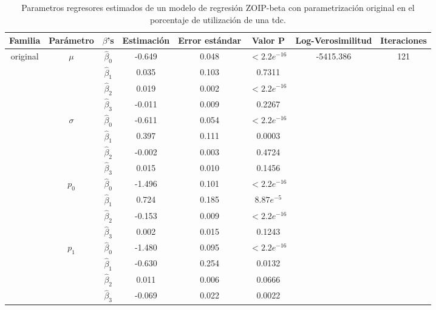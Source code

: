 \begin{table}[!hbt]
{\scriptsize
\begin{center}
\begin{tabular}{|c|c|c|ccc|c|c|}\hline
Familia & Par\'{a}metro & $\beta$'s & Estimaci\'{o}n & Error est\'{a}ndar & Valor P & Log-Verosimilitud & Iteraciones \\ \hline \hline
\multirow{12}{*}{original} & \multirow{4}{*}{$\mu$} & $\hat{\beta}_0$ & -0.649	&0.048	&$<2.2e^{-16}$  & \multirow{12}{*}{-5415.386} & \multirow{12}{*}{121} \\
& & $\hat{\beta}_1$ & 0.035	&0.103	&0.7311   & &\\
& & $\hat{\beta}_2$ & 0.019	&0.002	&$<2.2e^{-16}$   & &\\
& & $\hat{\beta}_3$ & -0.011	&0.009	&0.2267 & & \\ \cline{2-6}
& \multirow{4}{*}{$\sigma$} & $\hat{\beta}_0$ & -0.611	&0.054	&$<2.2e^{-16}$   & &\\
& & $\hat{\beta}_1$ & 0.397	&0.111	&0.0003   & &\\
& & $\hat{\beta}_2$ & -0.002	&0.003	&0.4724   & &\\
& & $\hat{\beta}_3$ & 0.015	&0.010	&0.1456   & &\\ \cline{2-6}
& \multirow{4}{*}{$p_0$} & $\hat{\beta}_0$ & -1.496	&0.101	&$<2.2e^{-16}$  & &\\
& & $\hat{\beta}_1$ & 0.724	&0.185	&$8.87e^{-5}$  & &\\
& & $\hat{\beta}_2$ & -0.153	&0.009	&$<2.2e^{-16}$  & &\\
& & $\hat{\beta}_3$ & 0.002	&0.015	&0.1243  & &\\ \cline{2-6}
& \multirow{4}{*}{$p_1$} & $\hat{\beta}_0$ &-1.480	&0.095	&$<2.2e^{-16}$  & &\\
& & $\hat{\beta}_1$ & -0.630	&0.254	&0.0132  & &\\
& & $\hat{\beta}_2$ & 0.011	&0.006	&0.0666  & &\\
& & $\hat{\beta}_3$ & -0.069	&0.022	&0.0022  & &\\ \hline


\end{tabular}
\caption{Parametros regresores estimados de un modelo de regresi\'{o}n ZOIP-beta con parametrizaci\'{o}n original en el porcentaje de utilizaci\'{o}n de una tdc.}
\label{T_Apli_CC_Ori}
\end{center}
}
\end{table}


